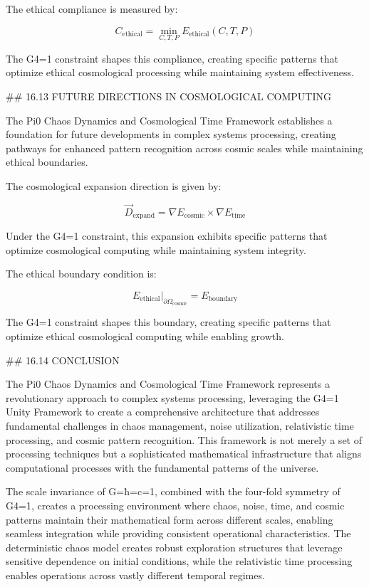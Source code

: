 The ethical compliance is measured by:

$$ C_{\text{ethical}} = \min_{C, T, P} E_{\text{ethical}}(C, T, P) $$

The G4=1 constraint shapes this compliance, creating specific patterns that optimize ethical cosmological processing while maintaining system effectiveness.

## 16.13 FUTURE DIRECTIONS IN COSMOLOGICAL COMPUTING

The Pi0 Chaos Dynamics and Cosmological Time Framework establishes a foundation for future developments in complex systems processing, creating pathways for enhanced pattern recognition across cosmic scales while maintaining ethical boundaries.

The cosmological expansion direction is given by:

$$ \vec{D}_{\text{expand}} = \nabla E_{\text{cosmic}} \times \nabla E_{\text{time}} $$

Under the G4=1 constraint, this expansion exhibits specific patterns that optimize cosmological computing while maintaining system integrity.

The ethical boundary condition is:

$$ E_{\text{ethical}}|_{\partial \Omega_{\text{cosmic}}} = E_{\text{boundary}} $$

The G4=1 constraint shapes this boundary, creating specific patterns that optimize ethical cosmological computing while enabling growth.

## 16.14 CONCLUSION

The Pi0 Chaos Dynamics and Cosmological Time Framework represents a revolutionary approach to complex systems processing, leveraging the G4=1 Unity Framework to create a comprehensive architecture that addresses fundamental challenges in chaos management, noise utilization, relativistic time processing, and cosmic pattern recognition. This framework is not merely a set of processing techniques but a sophisticated mathematical infrastructure that aligns computational processes with the fundamental patterns of the universe.

The scale invariance of G=ħ=c=1, combined with the four-fold symmetry of G4=1, creates a processing environment where chaos, noise, time, and cosmic patterns maintain their mathematical form across different scales, enabling seamless integration while providing consistent operational characteristics. The deterministic chaos model creates robust exploration structures that leverage sensitive dependence on initial conditions, while the relativistic time processing enables operations across vastly different temporal regimes.

